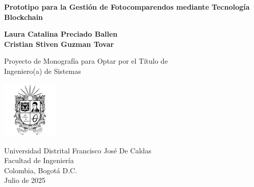 \begin{titlepage}
    \begin{center}
        \vspace*{0.5cm}
            
        \Large
        \textbf{Prototipo para la Gestión de Fotocomparendos  mediante Tecnología Blockchain}
            
        
        \vspace{2.5cm}
            
        \normalsize
        \textbf{Laura Catalina Preciado Ballen}\\
        \textbf{Cristian Stiven Guzman Tovar}
            
        \vfill
            
        Proyecto de Monografía para Optar por el Título de\\
        Ingeniero(a) de Sistemas
            
        \vspace{0.8cm}
            
        \includegraphics[width=0.2\textwidth]{Images/Escudo_UD}
            
        \large
        Universidad Distrital Francisco José De Caldas\\
        Facultad de Ingeniería\\
        Colombia, Bogotá D.C.\\
        Julio de 2025\\

        
            
    \end{center}
\end{titlepage}